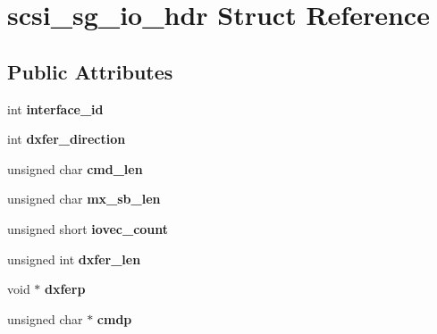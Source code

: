 \hypertarget{structscsi__sg__io__hdr}{}\section{scsi\+\_\+sg\+\_\+io\+\_\+hdr Struct Reference}
\label{structscsi__sg__io__hdr}
\subsection*{Public Attributes}
\begin{DoxyCompactItemize}
\item 
\hypertarget{structscsi__sg__io__hdr_aece2c0fc84360c08efc15d8b69c68743}{}int {\bfseries interface\+\_\+id}\label{structscsi__sg__io__hdr_aece2c0fc84360c08efc15d8b69c68743}

\item 
\hypertarget{structscsi__sg__io__hdr_a0cb1fe4fd08a34388504969acc05271a}{}int {\bfseries dxfer\+\_\+direction}\label{structscsi__sg__io__hdr_a0cb1fe4fd08a34388504969acc05271a}

\item 
\hypertarget{structscsi__sg__io__hdr_aaada923e4d45feac1c9a2857ec8ea86e}{}unsigned char {\bfseries cmd\+\_\+len}\label{structscsi__sg__io__hdr_aaada923e4d45feac1c9a2857ec8ea86e}

\item 
\hypertarget{structscsi__sg__io__hdr_aa8cf3ce24fc82609362c3e66aa155dc6}{}unsigned char {\bfseries mx\+\_\+sb\+\_\+len}\label{structscsi__sg__io__hdr_aa8cf3ce24fc82609362c3e66aa155dc6}

\item 
\hypertarget{structscsi__sg__io__hdr_af53d544979a5757f6dca8e73c422f0f1}{}unsigned short {\bfseries iovec\+\_\+count}\label{structscsi__sg__io__hdr_af53d544979a5757f6dca8e73c422f0f1}

\item 
\hypertarget{structscsi__sg__io__hdr_aac86e7e6e9e15d9cc93336c4aad7f9c7}{}unsigned int {\bfseries dxfer\+\_\+len}\label{structscsi__sg__io__hdr_aac86e7e6e9e15d9cc93336c4aad7f9c7}

\item 
\hypertarget{structscsi__sg__io__hdr_affb4dd9392727e68db6c805adcc242fe}{}void $\ast$ {\bfseries dxferp}\label{structscsi__sg__io__hdr_affb4dd9392727e68db6c805adcc242fe}

\item 
\hypertarget{structscsi__sg__io__hdr_a087af348a8fee328dbaeaa34a92d8214}{}unsigned char $\ast$ {\bfseries cmdp}\label{structscsi__sg__io__hdr_a087af348a8fee328dbaeaa34a92d8214}


\end{DoxyCompactItemize}
